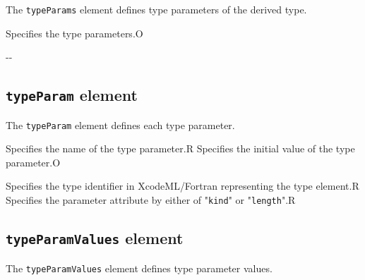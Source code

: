 The {\tt typeParams} element defines type parameters of the derived type.


\begin{XcodeMLChildElements}
{Specifies the type parameters.}{O}
\end{XcodeMLChildElements}

\begin{XcodeMLAttributes}
\XcodeMLAttrDef{-}{-}
{-}{-}
\end{XcodeMLAttributes}


\subsection{ {\tt typeParam} element}

The {\tt typeParam} element defines each type parameter.


\begin{XcodeMLChildElements}
{Specifies the name of the type parameter.}{R}
{Specifies the initial value of the type parameter.}{O}
\end{XcodeMLChildElements}

\begin{XcodeMLAttributes}
{Specifies the type identifier in XcodeML/Fortran representing the type element.}{R}
{Specifies the parameter attribute by either of "{\tt kind}" or "{\tt length}".}{R}
\end{XcodeMLAttributes}


\subsection{ {\tt typeParamValues} element}

The {\tt typeParamValues} element defines type parameter values.


